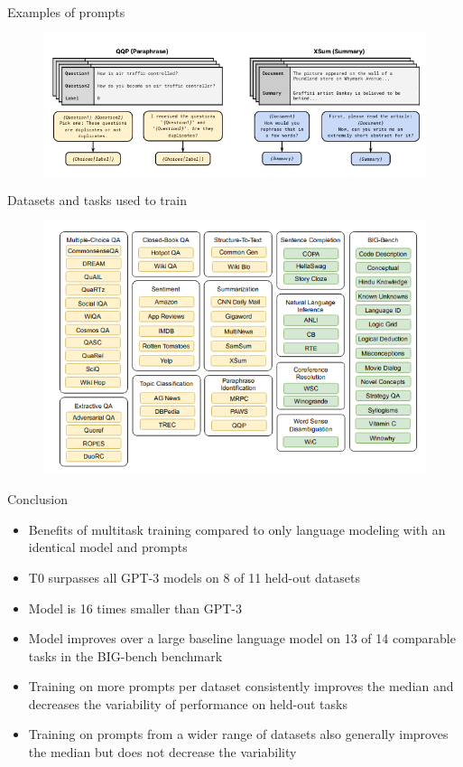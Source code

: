 \documentclass[english]{mlutalk}
\begin{document}
\begin{frame}{Examples of prompts}
    \begin{figure}
      \centering
      \includegraphics[width=\linewidth]{figures/prompts.png}
    \end{figure}
\end{frame}

\begin{frame}{Datasets and tasks used to train}
  \begin{figure}
    \centering
    \includegraphics[width=\linewidth]{figures/t0_datasets.png}
  \end{figure}
\end{frame}

\begin{frame}{Conclusion}
    \begin{itemize}
      \item Benefits of multitask training compared to only language modeling with an identical model and prompts
      \item T0 surpasses all GPT-3 models on 8 of 11 held-out datasets
      \item Model is 16 times smaller than GPT-3
      \item Model improves over a large baseline language model on 13 of 14 comparable tasks in the BIG-bench benchmark
      \item Training on more prompts per dataset consistently improves the median and decreases the variability of performance on held-out tasks
      \item Training on prompts from a wider range of datasets also generally improves the median but does not decrease the variability
    \end{itemize}
\end{frame}

\appendix
\section{\appendixname}

\bibliographyframe
\end{document}
